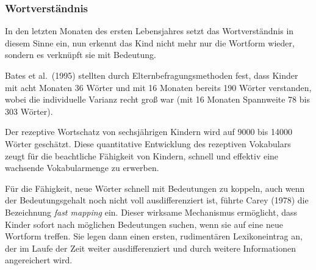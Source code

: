\documentclass[
  letterpaper,
]{scrbook}
\begin{document}
\hypertarget{wortverstuxe4ndnis}{%
\subsubsection{Wortverständnis}\label{wortverstuxe4ndnis}}

In den letzten Monaten des ersten Lebensjahres setzt das Wortverständnis
in diesem Sinne ein, nun erkennt das Kind nicht mehr nur die Wortform
wieder, sondern es verknüpft sie mit Bedeutung.

\begin{tcolorbox}[enhanced jigsaw, breakable, colframe=quarto-callout-note-color-frame, bottomrule=.15mm, left=2mm, opacityback=0, colback=white, rightrule=.15mm, toprule=.15mm, leftrule=.75mm, arc=.35mm]
\begin{minipage}[t]{5.5mm}
\textcolor{quarto-callout-note-color}{\faInfo}
\end{minipage}%
\begin{minipage}[t]{\textwidth - 5.5mm}

Bates et al.~(1995) stellten durch Elternbefragungsmethoden fest, dass
Kinder mit acht Monaten 36 Wörter und mit 16 Monaten bereits 190 Wörter
verstanden, wobei die individuelle Varianz recht groß war (mit 16
Monaten Spannweite 78 bis 303 Wörter).

\end{minipage}%
\end{tcolorbox}

Der rezeptive Wortschatz von sechsjährigen Kindern wird auf 9000 bis
14000 Wörter geschätzt. Diese quantitative Entwicklung des rezeptiven
Vokabulars zeugt für die beachtliche Fähigkeit von Kindern, schnell und
effektiv eine wachsende Vokabularmenge zu erwerben.

Für die Fähigkeit, neue Wörter schnell mit Bedeutungen zu koppeln, auch
wenn der Bedeutungsgehalt noch nicht voll ausdifferenziert ist, führte
Carey (1978) die Bezeichnung \emph{fast mapping} ein. Dieser wirksame
Mechanismus ermöglicht, dass Kinder sofort nach möglichen Bedeutungen
suchen, wenn sie auf eine neue Wortform treffen. Sie legen dann einen
ersten, rudimentären Lexikoneintrag an, der im Laufe der Zeit weiter
ausdifferenziert und durch weitere Informationen angereichert wird.
\end{document}
